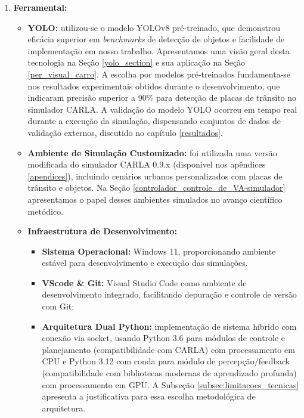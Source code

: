 \documentclass[
	12pt,				%
	oneside, %
	a4paper,			%
	english,			%
	french,				%
	spanish,			%
	brazil				%
	]{abntex2}
\begin{document}
\begin{enumerate}
    
    \item \textbf{Ferramental:}
    \begin{itemize}
        \item \textbf{YOLO:} utilizou-se o modelo YOLOv8 pré-treinado, que demonstrou eficácia superior em \textit{benchmarks} de detecção de objetos \cite{wang2024yolov10realtimeendtoendobject} e facilidade de implementação em nosso trabalho. Apresentamos uma visão geral desta tecnologia na Seção \ref{yolo_section} e sua aplicação na Seção \ref{per_visual_carro}. A escolha por modelos pré-treinados fundamenta-se nos resultados experimentais obtidos durante o desenvolvimento, que indicaram precisão superior a 90\% para detecção de placas de trânsito no simulador CARLA. A validação do modelo YOLO ocorreu em tempo real durante a execução da simulação, dispensando conjuntos de dados de validação externos, discutido no capítulo \ref{resultados}.
        
        \item \textbf{Ambiente de Simulação Customizado:} foi utilizada uma versão modificada do simulador CARLA 0.9.x (disponível nos apêndices \ref{apendices}), incluindo cenários urbanos personalizados com placas de trânsito e objetos. Na Seção \ref{controlador_controle_de_VA-simulador} apresentamos o papel desses ambientes simulados no avanço científico metódico. 
        
        \item \textbf{Infraestrutura de Desenvolvimento:}
            \begin{itemize}
            \item \textbf{Sistema Operacional:} Windows 11, proporcionando ambiente estável para desenvolvimento e execução das simulações.
            \item \textbf{VScode \& Git:} Visual Studio Code como ambiente de desenvolvimento integrado, facilitando depuração e controle de versão com Git;
            \item \textbf{Arquitetura Dual Python:} implementação de sistema híbrido com conexão via socket, usando Python 3.6 para módulos de controle e planejamento (compatibilidade com CARLA) com processamento em CPU e Python 3.12 com conda para módulo de percepção/feedback (compatibilidade com bibliotecas modernas de aprendizado profunda) com processamento em GPU. A Subseção \ref{subsec:limitacoes_tecnicas} apresenta a justificativa para essa escolha metodológica de arquitetura.
            \end{itemize}
        

\end{itemize}
\end{enumerate}
\end{document}
